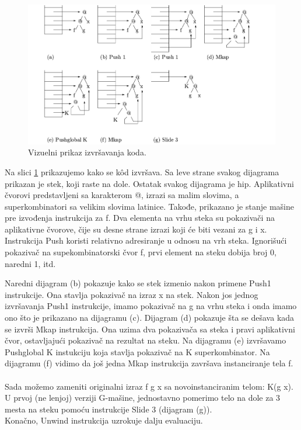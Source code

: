 \begin{figure}[h!]
	\centering
	\includegraphics[scale=0.35]{primerGmasine.png}
	
	\caption{Vizuelni prikaz izvršavanja koda.}
	\label{fig:primerGmasine}
\end{figure}

Na slici \ref{fig:primerGmasine} prikazujemo kako se k\^ od izvršava. Sa leve strane svakog dijagrama prikazan je stek, koji raste na dole. Ostatak svakog dijagrama je hip. Aplikativni čvorovi predstavljeni sa karakterom @, izrazi sa malim slovima, a superkombinatori sa velikim slovima latinice. Takođe, prikazano je stanje mašine pre izvođenja instrukcija za f. Dva elementa na vrhu steka su pokazivači na aplikativne čvorove, čije su desne strane izrazi koji će biti vezani za g i x. Instrukcija Push koristi relativno adresiranje u odnosu na vrh steka. Ignorišući pokazivač na supekombinatorski čvor f, prvi element na steku dobija broj 0, naredni 1, itd.

Naredni dijagram (b) pokazuje kako se stek izmenio nakon primene Push1 instrukcije. Ona stavlja pokazivač na izraz x na stek. Nakon jos jednog izvršavanja Push1 instrukcije, imamo pokazivač na g na vrhu steka i onda imamo ono što je prikazano na dijagramu (c). Dijagram (d) pokazuje šta se dešava kada se izvrši Mkap instrukcija. Ona uzima dva pokazivača sa steka i pravi aplikativni čvor, ostavljajući pokazivač na rezultat na steku. Na dijagramu (e) izvršavamo Pushglobal K instukciju koja stavlja pokazivač na K superkombinator. Na dijagramu (f) vidimo da još jedna Mkap instrukcija završava instanciranje tela f.\\ 
\\
Sada možemo zameniti originalni izraz f g x  sa novoinstanciranim telom: K(g x). U prvoj (ne lenjoj) verziji G-mašine, jednostavno pomerimo telo na dole za 3 mesta na steku pomoću instrukcije Slide 3 (dijagram (g)).\\ Konačno, Unwind instrukcija uzrokuje dalju evaluaciju.




